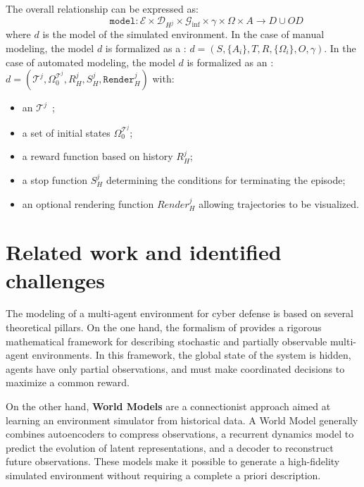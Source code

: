 The overall relationship can be expressed as:
\begin{displaymath}
  \hspace{2cm}\texttt{model}: \mathcal{E} \times \mathcal{D}_{H^j} \times \mathcal{G}_{\text{inf}} \times \gamma \times \Omega \times A \rightarrow D \cup OD
\end{displaymath}
%
where $d$ is the model of the simulated environment.
In the case of manual modeling, the model $d$ is formalized as a : $d = (S,\{A_i\},T,R,\{\Omega_i\},O,\gamma)$.
%
In the case of automated modeling, the model $d$ is formalized as an : $d = (\mathcal{T}^j, \Omega^{\mathcal{T}^j}_0, R^j_H, S^j_H, \texttt{Render}^j_H)$ with:
\begin{itemize}
  \item an  $\mathcal{T}^j$~;
  \item a set of initial states $\Omega^{\mathcal{T}^j}_0$;
  \item a reward function based on history $R^j_H$;
  \item a stop function $S^j_H$ determining the conditions for terminating the episode;
  \item an optional rendering function $Render^j_H$ allowing trajectories to be visualized.
\end{itemize}

\section{Related work and identified challenges}

The modeling of a multi-agent environment for cyber defense is based on several theoretical pillars.
On the one hand, the formalism of \textbf{} provides a rigorous mathematical framework for describing stochastic and partially observable multi-agent environments.
In this framework, the global state of the system is hidden, agents have only partial observations, and must make coordinated decisions to maximize a common reward.

On the other hand, \textbf {World Models} are a connectionist approach aimed at learning an environment simulator from historical data.
A World Model generally combines autoencoders to compress observations, a recurrent dynamics model to predict the evolution of latent representations, and a decoder to reconstruct future observations.
These models make it possible to generate a high-fidelity simulated environment without requiring a complete a priori description.

